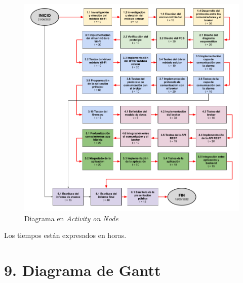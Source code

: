 \documentclass[
11pt, %
codirector, %
]{charter}
\begin{document}
\begin{figure}[htpb]
\centering 
\includegraphics[width=\textwidth]{./Figuras/AoN.png}
\caption{Diagrama en \textit{Activity on Node}}
\label{fig:AoN}
\end{figure}

Los tiempos están expresados en horas.



\section{9. Diagrama de Gantt}
\label{sec:gantt}
\end{document}
